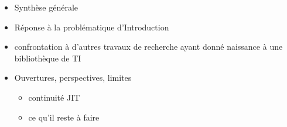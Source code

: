 
\begin{itemize}
  \item Synthèse générale
  \item Réponse à la problématique d'Introduction
  \item confrontation à d'autres travaux de recherche ayant donné naissance à une bibliothèque de TI
  \item Ouvertures, perspectives, limites
  \begin{itemize}
    \item continuité JIT
    \item ce qu'il reste à faire
  \end{itemize}
\end{itemize}